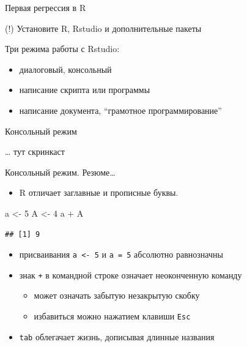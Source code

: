 \documentclass[ignorenonframetext,]{beamer}
\newenvironment{Shaded}{\begin{snugshade}}{\end{snugshade}}
\newcommand{\DecValTok}[1]{\textcolor[rgb]{0.00,0.00,0.81}{{#1}}}
\newcommand{\StringTok}[1]{\textcolor[rgb]{0.31,0.60,0.02}{{#1}}}
\newcommand{\NormalTok}[1]{{#1}}
\begin{document}
\begin{frame}{Первая регрессия в R}

(!) Установите R, Rstudio и дополнительные пакеты

Три режима работы с Rstudio:

\begin{itemize}
\item
  диалоговый, консольный
\item
  написание скрипта или программы
\item
  написание документа, ``грамотное программирование''
\end{itemize}

\end{frame}

\begin{frame}{Консольный режим}

\ldots{} тут скринкаст

\end{frame}

\begin{frame}[fragile]{Консольный режим. Резюме\ldots{}}

\begin{itemize}
\itemsep1pt\parskip0pt
\item
  R отличает заглавные и прописные буквы.
\end{itemize}

\begin{Shaded}
\begin{Highlighting}[]
\NormalTok{a <-}\StringTok{ }\DecValTok{5}
\NormalTok{A <-}\StringTok{ }\DecValTok{4}
\NormalTok{a +}\StringTok{ }\NormalTok{A}
\end{Highlighting}
\end{Shaded}

\begin{verbatim}
## [1] 9
\end{verbatim}

\begin{itemize}
\item
  присваивания \texttt{a \textless{}- 5} и \texttt{a = 5} абсолютно
  равнозначны
\item
  знак \texttt{+} в командной строке означает неоконченную команду

  \begin{itemize}
  \itemsep1pt\parskip0pt
  \item
    может означать забытую незакрытую скобку
  \item
    избавиться можно нажатием клавиши \texttt{Esc}
  \end{itemize}
\item
  \texttt{tab} облегачает жизнь, дописывая длинные названия
\end{itemize}

\end{frame}
\end{document}
